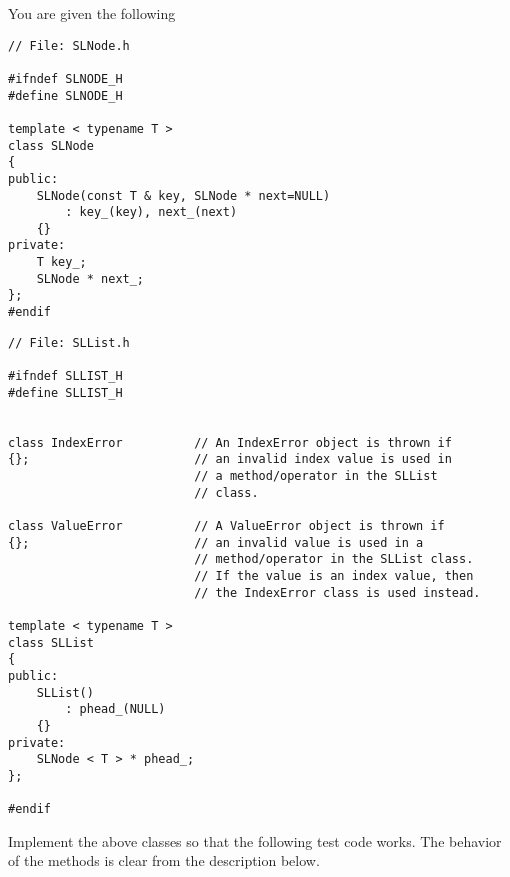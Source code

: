 You are given the following 

{\small
\begin{Verbatim}[frame=single,fontsize=\footnotesize]
// File: SLNode.h

#ifndef SLNODE_H
#define SLNODE_H

template < typename T > 
class SLNode
{
public:
    SLNode(const T & key, SLNode * next=NULL)
        : key_(key), next_(next)
    {}
private:
    T key_;
    SLNode * next_;
};
#endif
\end{Verbatim}

\begin{Verbatim}[frame=single,fontsize=\footnotesize]
// File: SLList.h

#ifndef SLLIST_H
#define SLLIST_H


class IndexError          // An IndexError object is thrown if
{};                       // an invalid index value is used in
                          // a method/operator in the SLList
                          // class.
                          
class ValueError          // A ValueError object is thrown if
{};                       // an invalid value is used in a
                          // method/operator in the SLList class.
                          // If the value is an index value, then
                          // the IndexError class is used instead.
                          
template < typename T >
class SLList
{
public:
    SLList()
        : phead_(NULL)
    {}
private:
    SLNode < T > * phead_;
};

#endif
\end{Verbatim}
}

Implement the above classes so that the following test code works.
The behavior of the methods is clear from the
description below.

